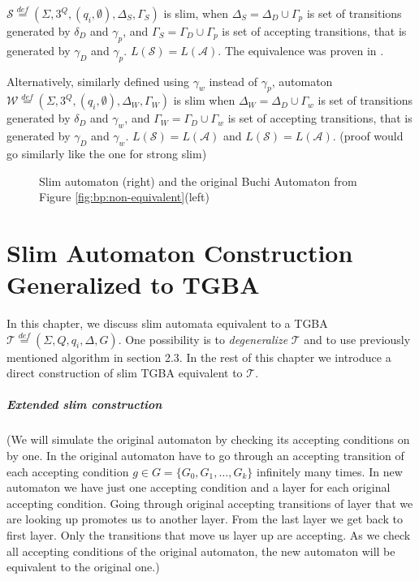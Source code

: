\documentclass[
	digital
nolof, nolot
]{fithesis3}
\newcommand{\cA}{\mathcal{A}}
\newcommand{\cS}{\mathcal{S}}
\newcommand{\cT}{\mathcal{T}}
\newcommand{\lA}{L(\cA)}
\newcommand{\lS}{L(\cS)}
\newcommand{\eqdef}{\overset{def}{=}}
\begin{document}
			
			$\cS\eqdef(\Sigma, 3^Q, (q_i,\emptyset), \Delta_S ,\Gamma_S)$ is slim, when
			$\Delta_S=\Delta_D \cup \Gamma_p$ is set of transitions generated by $\delta_D$ and $\gamma_p$, and
			$\Gamma_S=\Gamma_D \cup \Gamma_p$ is set of accepting transitions, that is generated by $\gamma_D$ and $\gamma_p$. $\lS = \lA$. The equivalence was proven in \cite{hlavni}.
			
			Alternatively, similarly defined using $\gamma_w$ instead of $\gamma_{p}$, automaton $\mathcal{W}\eqdef(\Sigma, 3^Q, (q_i,\emptyset), \Delta_W, \Gamma_W)$ is slim  when
			$\Delta_W=\Delta_D \cup \Gamma_w$ is set of transitions generated by $\delta_D$ and $\gamma_w$, and
			$\Gamma_W=\Gamma_D \cup \Gamma_w$ is set of accepting transitions, that is generated by $\gamma_D$ and $\gamma_w$. $\lS = \lA$ and $\lS=\lA$. (proof would go similarly like the one for strong slim)
			
			\begin{figure}[ht]
				\begin{center}
				
				\end{center}
				\caption{Slim automaton (right) and the original Buchi Automaton from Figure \ref{fig:bp:non-equivalent}(left)}
				\label{fig:slim:equivalent}
			\end{figure}

			
			\chapter{Slim Automaton Construction Generalized to TGBA} \label{section:gslim}
			In this chapter, we discuss slim automata equivalent to a TGBA $\cT\eqdef(\Sigma, Q, q_i, \Delta, G)$.
			One possibility is to \emph{degeneralize} $\cT$ and to use previously mentioned algorithm in section 2.3.
			In the rest of this chapter we introduce a direct construction of slim TGBA equivalent to $\cT$.
			\paragraph{Extended slim construction}
			(We will simulate the original automaton by checking its accepting conditions on by one. In the original automaton have to go through an accepting transition of each accepting condition $g \in G=\{G_0, G_1, \ldots, G_k\}$ infinitely many times. In new automaton we have just one accepting condition and a layer for each original accepting condition. Going through original accepting transitions of layer that we are looking up promotes us to another layer. From the last layer we get back to first layer. Only the transitions that move us layer up are accepting. As we check all accepting conditions of the original automaton, the new automaton will be equivalent to the original one.)
			
\end{document}
